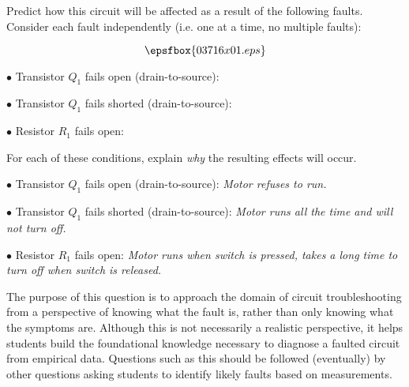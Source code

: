 

Predict how this circuit will be affected as a result of the following faults.  Consider each fault independently (i.e. one at a time, no multiple faults):

$$\epsfbox{03716x01.eps}$$

\medskip
\item{$\bullet$} Transistor $Q_1$ fails open (drain-to-source):
\vskip 5pt
\item{$\bullet$} Transistor $Q_1$ fails shorted (drain-to-source):
\vskip 5pt
\item{$\bullet$} Resistor $R_1$ fails open:
\medskip

For each of these conditions, explain {\it why} the resulting effects will occur.







\medskip
\item{$\bullet$} Transistor $Q_1$ fails open (drain-to-source): {\it Motor refuses to run.}
\vskip 5pt
\item{$\bullet$} Transistor $Q_1$ fails shorted (drain-to-source): {\it Motor runs all the time and will not turn off.}
\vskip 5pt
\item{$\bullet$} Resistor $R_1$ fails open: {\it Motor runs when switch is pressed, takes a long time to turn off when switch is released.}
\medskip







The purpose of this question is to approach the domain of circuit troubleshooting from a perspective of knowing what the fault is, rather than only knowing what the symptoms are.  Although this is not necessarily a realistic perspective, it helps students build the foundational knowledge necessary to diagnose a faulted circuit from empirical data.  Questions such as this should be followed (eventually) by other questions asking students to identify likely faults based on measurements.




